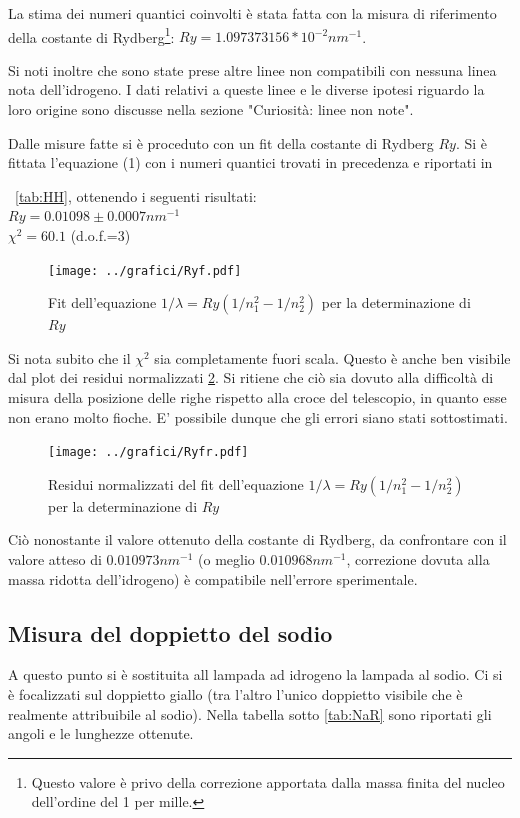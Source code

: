 \documentclass[a4paper,10pt]{article}
\begin{document}
{{{{{{La stima dei numeri quantici coinvolti è stata fatta con la misura di riferimento della costante di Rydberg\footnote{ Questo valore è privo della correzione apportata dalla massa finita del nucleo dell'ordine del 1 per mille.}: $Ry=1.097373156 * 10^{-2} nm^{-1}$. 


Si noti inoltre che sono state prese altre linee non compatibili con nessuna linea nota dell'idrogeno. I dati relativi a queste linee e le diverse ipotesi riguardo la loro origine sono discusse nella sezione "Curiosità: linee non note".


Dalle misure fatte si è proceduto con un fit della costante di Rydberg $Ry$. Si è fittata l'equazione (1) con i numeri quantici trovati in precedenza e riportati in \tablename{~\ref{tab:HH}, ottenendo i seguenti risultati:\\
$Ry= 0.01098 \pm 0.0007 nm^{-1}$ \\
$\chi^2=60.1$ (d.o.f.=3)

 

\begin{figure}[H]
	\centering
	\texttt{[image: ../grafici/Ryf.pdf]}
	\caption{Fit dell'equazione $1/\lambda=Ry(1/n_1^2-1/n_2^2)$ per la determinazione di $Ry$}
	\label{fig:Idrogeno, serie Balmer}
\end{figure}

Si nota subito che il $\chi^2$ sia completamente fuori scala. Questo è anche ben visibile dal plot dei residui normalizzati \ref{fig:Idrogeno, Residui normalizzati}. Si ritiene che ciò sia dovuto alla difficoltà di misura della posizione delle righe rispetto alla croce del telescopio, in quanto esse non erano molto fioche. E' possibile dunque che gli errori siano stati sottostimati.

\begin{figure}[H]
	\centering
	\texttt{[image: ../grafici/Ryfr.pdf]}
	\caption{Residui normalizzati del fit dell'equazione $1/\lambda=Ry(1/n_1^2-1/n_2^2)$ per la determinazione di $Ry$}
	\label{fig:Idrogeno, Residui normalizzati}
\end{figure}


Ciò nonostante il valore ottenuto della costante di Rydberg, da confrontare con il valore atteso di $0.010973 nm^{-1}$ (o meglio $0.010968 nm^{-1}$, correzione dovuta alla massa ridotta dell'idrogeno) è compatibile nell'errore sperimentale.
 

\subsection{Misura del doppietto del sodio}
A questo punto si è sostituita all lampada ad idrogeno la lampada al sodio. Ci si è focalizzati sul doppietto giallo (tra l'altro l'unico doppietto visibile che è realmente attribuibile al sodio). Nella tabella sotto \ref{tab:NaR} sono riportati gli angoli e le lunghezze ottenute.

}}}}}}}
\end{document}

